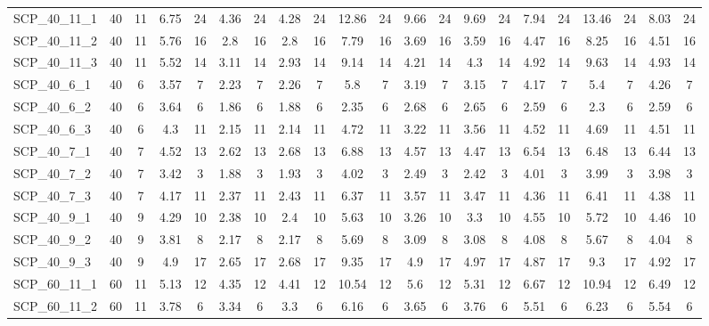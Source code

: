 \begin{sidewaystable}[!ht]
{\begin{tabular}{lcccccccccccccccccccc}
SCP\_40\_11\_1 & 40 & 11 & 6.75 & 24 & 4.36 & 24 &  \textcolor{blue2}{4.28} & 24 & 12.86 & 24 & 9.66 & 24 & 9.69 & 24 & 7.94 & 24 & 13.46 & 24 & 8.03 & 24 \\
SCP\_40\_11\_2 & 40 & 11 & 5.76 & 16 &  \textcolor{blue2}{2.8} & 16 &  \textcolor{blue2}{2.8} & 16 & 7.79 & 16 & 3.69 & 16 & 3.59 & 16 & 4.47 & 16 & 8.25 & 16 & 4.51 & 16 \\
SCP\_40\_11\_3 & 40 & 11 & 5.52 & 14 & 3.11 & 14 &  \textcolor{blue2}{2.93} & 14 & 9.14 & 14 & 4.21 & 14 & 4.3 & 14 & 4.92 & 14 & 9.63 & 14 & 4.93 & 14 \\
SCP\_40\_6\_1 & 40 & 6 & 3.57 & 7 &  \textcolor{blue2}{2.23} & 7 & 2.26 & 7 & 5.8 & 7 & 3.19 & 7 & 3.15 & 7 & 4.17 & 7 & 5.4 & 7 & 4.26 & 7 \\
SCP\_40\_6\_2 & 40 & 6 & 3.64 & 6 &  \textcolor{blue2}{1.86} & 6 & 1.88 & 6 & 2.35 & 6 & 2.68 & 6 & 2.65 & 6 & 2.59 & 6 & 2.3 & 6 & 2.59 & 6 \\
SCP\_40\_6\_3 & 40 & 6 & 4.3 & 11 & 2.15 & 11 &  \textcolor{blue2}{2.14} & 11 & 4.72 & 11 & 3.22 & 11 & 3.56 & 11 & 4.52 & 11 & 4.69 & 11 & 4.51 & 11 \\
SCP\_40\_7\_1 & 40 & 7 & 4.52 & 13 &  \textcolor{blue2}{2.62} & 13 & 2.68 & 13 & 6.88 & 13 & 4.57 & 13 & 4.47 & 13 & 6.54 & 13 & 6.48 & 13 & 6.44 & 13 \\
SCP\_40\_7\_2 & 40 & 7 & 3.42 & 3 &  \textcolor{blue2}{1.88} & 3 & 1.93 & 3 & 4.02 & 3 & 2.49 & 3 & 2.42 & 3 & 4.01 & 3 & 3.99 & 3 & 3.98 & 3 \\
SCP\_40\_7\_3 & 40 & 7 & 4.17 & 11 &  \textcolor{blue2}{2.37} & 11 & 2.43 & 11 & 6.37 & 11 & 3.57 & 11 & 3.47 & 11 & 4.36 & 11 & 6.41 & 11 & 4.38 & 11 \\
SCP\_40\_9\_1 & 40 & 9 & 4.29 & 10 &  \textcolor{blue2}{2.38} & 10 & 2.4 & 10 & 5.63 & 10 & 3.26 & 10 & 3.3 & 10 & 4.55 & 10 & 5.72 & 10 & 4.46 & 10 \\
SCP\_40\_9\_2 & 40 & 9 & 3.81 & 8 &  \textcolor{blue2}{2.17} & 8 &  \textcolor{blue2}{2.17} & 8 & 5.69 & 8 & 3.09 & 8 & 3.08 & 8 & 4.08 & 8 & 5.67 & 8 & 4.04 & 8 \\
SCP\_40\_9\_3 & 40 & 9 & 4.9 & 17 &  \textcolor{blue2}{2.65} & 17 & 2.68 & 17 & 9.35 & 17 & 4.9 & 17 & 4.97 & 17 & 4.87 & 17 & 9.3 & 17 & 4.92 & 17 \\
SCP\_60\_11\_1 & 60 & 11 & 5.13 & 12 &  \textcolor{blue2}{4.35} & 12 & 4.41 & 12 & 10.54 & 12 & 5.6 & 12 & 5.31 & 12 & 6.67 & 12 & 10.94 & 12 & 6.49 & 12 \\
SCP\_60\_11\_2 & 60 & 11 & 3.78 & 6 & 3.34 & 6 &  \textcolor{blue2}{3.3} & 6 & 6.16 & 6 & 3.65 & 6 & 3.76 & 6 & 5.51 & 6 & 6.23 & 6 & 5.54 & 6 \\

\end{tabular}}
\end{sidewaystable}
